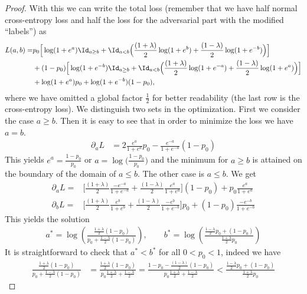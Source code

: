 \begin{proof}
    With this we can write the total loss (remember that we have half normal cross-entropy loss and half the loss for the adversarial part with the modified ``labels'') as
    \begin{align*}
    	L(a,b)=&  p_0\Big[\log(1+e^a) \Id_{a\geq b} 
           + \Id_{a<b}\Big( \frac{(1+\lambda)}{2}\log(1+e^b)+\frac{(1-\lambda)}{2}\log(1+e^{-b})\Big)\Big]\\ 
					 &+ (1-p_0)\Big[\log(1+e^{-b})   \Id_{a\geq b} +\Id_{a<b}\Big( \frac{(1+\lambda)}{2}\log(1+e^{-a})+\frac{(1-\lambda)}{2}\log(1+e^a)\Big)\Big]\\
           &+ \log(1+e^a)p_0 + \log(1+e^{-b})(1-p_0),
    \end{align*}
    where we have omitted a global factor $\frac{1}{2}$ for better readability (the last row is the cross-entropy loss).  We distinguish two sets in the optimization. First we consider the case $a\geq b$. Then it is easy to see that in order to minimize the loss we have $a=b$. 
    \begin{align*}
    	\partial_a L &= 2\frac{e^a}{1+e^a}p_0-\frac{e^{-a}}{1+e^{-a}}(1-p_0)
    \end{align*}
    This yields $e^a=\frac{1-p_0}{p_0}$ or $a=\log\big(\frac{1-p_0}{p_0}\big)$ and the minimum for $a\geq b$ is attained on the boundary of the domain of $a\leq b$. The other case is $a\leq b$. We get
    \begin{align*}
    	\partial_a L =& \Big[\frac{(1+\lambda)}{2}\frac{-e^{-a}}{1+e^{-a}}+\frac{(1-\lambda)}{2}\frac{e^a}{1+e^a}\Big](1-p_0)
                   + p_0 \frac{e^a}{1+e^a}\\
    	\partial_b L =& \Big[\frac{(1+\lambda)}{2}\frac{e^{b}}{1+e^{b}}+\frac{(1-\lambda)}{2}\frac{-e^b}{1+e^{-b}}\Big]p_0 
                  + (1-p_0) \frac{-e^{-b}}{1+e^{-b}}
    \end{align*}
    This yields the solution
    \begin{align*}
    	a^* = \log\left(\frac{\frac{1+\lambda}{2}(1-p_0)}{p_0 + \frac{1-\lambda}{2}(1-p_0)}\right), \qquad
    	b^* = \log\left(\frac{\frac{1-\lambda}{2}p_0 + (1-p_0)}{\frac{1+\lambda}{2}p_0}\right)
    \end{align*}
    It is straightforward to check that $a^*<b^*$ for all $0<p_0<1$, indeed we have
	\begin{align*}
		\frac{\frac{1+\lambda}{2}(1-p_0)}{p_0 + \frac{1-\lambda}{2}(1-p_0)} &= \frac{\frac{1+\lambda}{2}(1-p_0)}{p_0 \frac{1+\lambda}{2} +\frac{1-\lambda}{2}}
		=\frac{1-p_0 - \frac{(1-\lambda)}{2}(1-p_0)}{p_0 \frac{1+\lambda}{2} +\frac{1-\lambda}{2}} < \frac{\frac{1-\lambda}{2}p_0 + (1-p_0)}{\frac{1+\lambda}{2}p_0}

\end{align*}
\end{proof}

